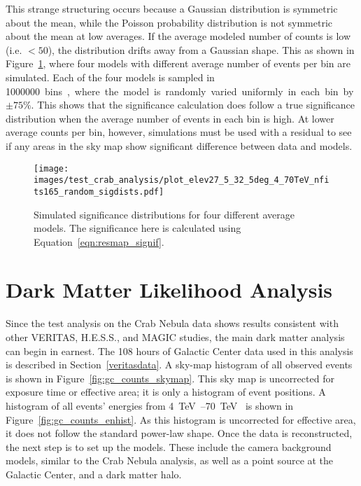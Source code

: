   This strange structuring occurs because a Gaussian distribution is symmetric about the mean, while the Poisson probability distribution is not symmetric about the mean at low averages.
  If the average modeled number of counts is low (i.e. $<50$), the distribution drifts away from a Gaussian shape.
  This as shown in Figure~\ref{fig:various_sig_dists}, where four models with different average number of events per bin are simulated.
  Each of the four models is sampled in \SI{1000000} bins, where the model is randomly varied uniformly in each bin by $\pm 75\%$.
  This shows that the significance calculation does follow a true significance distribution when the average number of events in each bin is high.
  At lower average counts per bin, however, simulations must be used with a residual to see if any areas in the sky map show significant difference between data and models.
  
  \begin{figure}[h]
    \centering
    \texttt{[image: images/test\_crab\_analysis/plot\_elev27\_5\_32\_5deg\_4\_70TeV\_nfits165\_random\_sigdists.pdf]}
    \caption[4 Simulated Significance Distributions]{
      Simulated significance distributions for four different average models.
      The significance here is calculated using Equation~\ref{eqn:resmap_signif}.
    }
    \label{fig:various_sig_dists}
  \end{figure}

  \FloatBarrier

\section{Dark Matter Likelihood Analysis}\label{sec:dmlike}
  
  Since the test analysis on the Crab Nebula data shows results consistent with other VERITAS, H.E.S.S., and MAGIC studies, the main dark matter analysis can begin in earnest.
  The 108 hours of Galactic Center data used in this analysis is described in Section~\ref{veritasdata}.
  A sky-map histogram of all observed events is shown in Figure~\ref{fig:gc_counts_skymap}.
  This sky map is uncorrected for exposure time or effective area; it is only a histogram of event positions.
  A histogram of all events' energies from \SIrange{4}{70}{\TeV{}} is shown in Figure~\ref{fig:gc_counts_enhist}.
  As this histogram is uncorrected for effective area, it does not follow the standard power-law shape.
  Once the data is reconstructed, the next step is to set up the models.
  These include the camera background models, similar to the Crab Nebula analysis, as well as a point source at the Galactic Center, and a dark matter halo.
  
